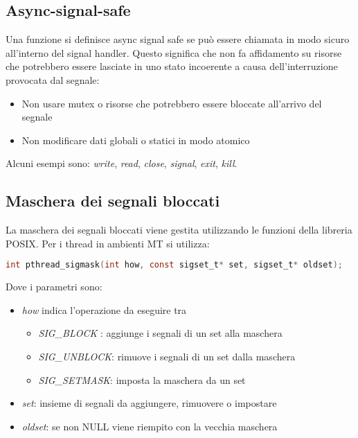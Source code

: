 \subsection{Async-signal-safe}
Una funzione si definisce async signal safe se può essere chiamata in modo sicuro all'interno del signal handler. Questo significa che non fa affidamento su risorse che potrebbero essere lasciate in uno stato incoerente a causa dell'interruzione provocata dal segnale:
\begin{itemize}
	\item Non usare mutex o risorse che potrebbero essere bloccate all'arrivo del segnale
	\item Non modificare dati globali o statici in modo atomico
\end{itemize}
Alcuni esempi sono: \textit{write}, \textit{read}, \textit{close}, \textit{signal}, \textit{exit}, \textit{kill}.

\subsection{Maschera dei segnali bloccati}
La maschera dei segnali bloccati viene gestita utilizzando le funzioni della libreria POSIX. Per i thread in ambienti MT si utilizza:
\begin{lstlisting}[language=C]
	int pthread_sigmask(int how, const sigset_t* set, sigset_t* oldset);
\end{lstlisting}
Dove i parametri sono:
\begin{itemize}
	\item \textit{how} indica l'operazione da eseguire tra
	\begin{itemize}
		\item \textit{SIG\_BLOCK} : aggiunge i segnali di un set alla maschera
		\item \textit{SIG\_UNBLOCK}: rimuove i segnali di un set dalla maschera
		\item \textit{SIG\_SETMASK}: imposta la maschera da un set
	\end{itemize}
	\item \textit{set}: insieme di segnali da aggiungere, rimuovere o impostare
	\item \textit{oldset}: se non NULL viene riempito con la vecchia maschera
\end{itemize}

